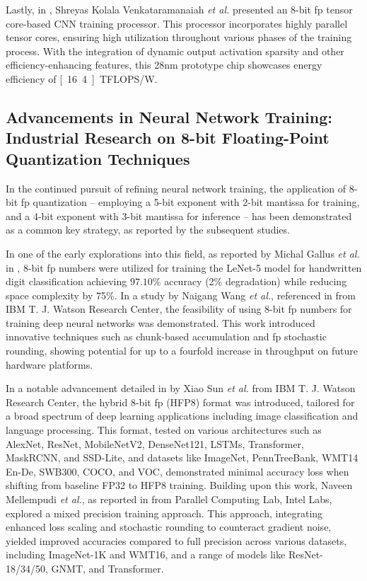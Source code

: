Lastly, in \cite{venkataramanaiah202228nm}, Shreyas Kolala Venkataramanaiah \textit{et al.} presented an 8-bit \gls{fp} tensor core-based CNN training processor. This processor incorporates highly parallel tensor cores, ensuring high utilization throughout various phases of the training process. With the integration of dynamic output activation sparsity and other efficiency-enhancing features, this 28nm prototype chip showcases energy efficiency of \unit[16.4]{TFLOPS/W}.



\subsection{Advancements in Neural Network Training: Industrial Research on 8-bit Floating-Point Quantization Techniques}
In the continued pursuit of refining neural network training, the application of 8-bit \gls{fp} quantization -- employing a 5-bit exponent with 2-bit mantissa for training, and a 4-bit exponent with 3-bit mantissa for inference -- has been demonstrated as a common key strategy, as reported by the subsequent studies.

In one of the early explorations into this field, as reported by Michal Gallus \textit{et al.} in \cite{gallus2018handwritten}, 8-bit \gls{fp} numbers were utilized for training the LeNet-5 model for handwritten digit classification achieving $97.10\%$ accuracy (2\% degradation) while reducing space complexity by 75\%. In a study by Naigang Wang \textit{et al.}, referenced in \cite{wang2018training} from IBM T. J. Watson Research Center, the feasibility of using 8-bit \gls{fp} numbers for training deep neural networks was demonstrated. This work introduced innovative techniques such as chunk-based accumulation and \gls{fp} stochastic rounding, showing potential for up to a fourfold increase in throughput on future hardware platforms.

In a notable advancement detailed in \cite{sun2019hybrid} by Xiao Sun \textit{et al.} from IBM T. J. Watson Research Center, the hybrid 8-bit \gls{fp} (HFP8) format was introduced, tailored for a broad spectrum of deep learning applications including image classification and language processing. This format, tested on various architectures such as AlexNet, ResNet, MobileNetV2, DenseNet121, LSTMs, Transformer, MaskRCNN, and SSD-Lite, and datasets like ImageNet, PennTreeBank, WMT14 En-De, SWB300, COCO, and VOC, demonstrated minimal accuracy loss when shifting from baseline FP32 to HFP8 training. Building upon this work, Naveen Mellempudi \textit{et al.}, as reported in \cite{mellempudi2019mixed} from Parallel Computing Lab, Intel Labs, explored a mixed precision training approach. This approach, integrating enhanced loss scaling and stochastic rounding to counteract gradient noise, yielded improved accuracies compared to full precision across various datasets, including ImageNet-1K and WMT16, and a range of models like ResNet-18/34/50, GNMT, and Transformer.

